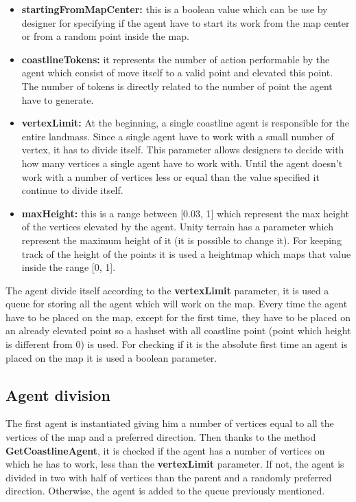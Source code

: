 \documentclass[12pt]{article}
\begin{document}
    \begin{itemize}
        \item \textbf{startingFromMapCenter:} this is a boolean value which can be use by designer for specifying if the agent have to start its work from the map center or
        from a random point inside the map.
        \item \textbf{coastlineTokens:} it represents the number of action performable by the agent which consist of move itself to a valid point and elevated this point. 
        The number of tokens is directly related to the number of point the agent have to generate.
        \item \textbf{vertexLimit:} At the beginning, a single coastline agent is responsible for the entire landmass. Since a single agent have to work with a small number
        of vertex, it has to divide itself. This parameter allows designers to decide with how many vertices a single agent have to work with. Until the agent doesn't
        work with a number of vertices less or equal than the value specified it continue to divide itself.
        \item \textbf{maxHeight:} this is a range between [0.03, 1] which represent the max height of the vertices elevated by the agent. Unity terrain has a parameter which 
        represent the maximum height of it (it is possible to change it). For keeping track of the height of the points it is used a heightmap which maps that value inside 
        the range [0, 1].
    \end{itemize}

    The agent divide itself according to the \textbf{vertexLimit} parameter, it is used a queue for storing all the agent which will work on the map. 
    Every time the agent have to be placed on the map, except for the first time, they have to be placed on an already elevated point so a hashset with all coastline point
    (point which height is different from 0) is used. For checking if it is the absolute first time an agent is placed on the map it is used a boolean parameter. 

    \subsection{Agent division}
    The first agent is instantiated giving him a number of vertices equal to all the vertices of the map and a preferred direction. Then thanks to the method \textbf{GetCoastlineAgent},
    it is checked if the agent has a number of vertices on which he has to work, less than the \textbf{vertexLimit} parameter. If not, the agent is divided in two with half
    of vertices than the parent and a randomly preferred direction. Otherwise, the agent is added to the queue previously mentioned.  
\end{document}
